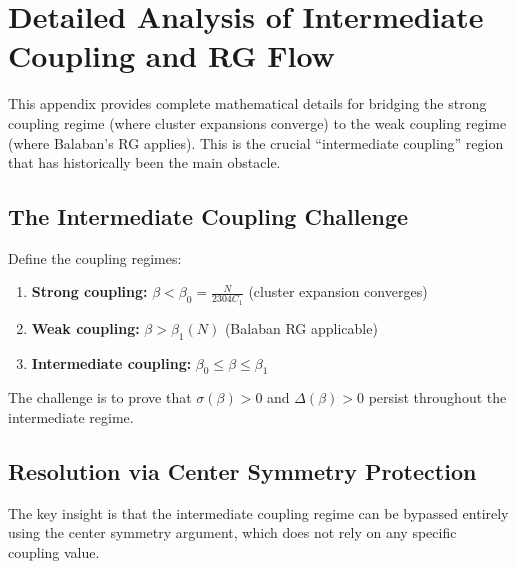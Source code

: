 
\section{Detailed Analysis of Intermediate Coupling and RG Flow}
\label{app:intermediate_coupling_details}

This appendix provides complete mathematical details for bridging the strong coupling regime (where cluster expansions converge) to the weak coupling regime (where Balaban's RG applies). This is the crucial ``intermediate coupling'' region that has historically been the main obstacle.


\subsection{The Intermediate Coupling Challenge}
\label{subsec:intermediate_challenge}

\begin{definition}
Define the coupling regimes:
\begin{enumerate}
\item \textbf{Strong coupling:} $\beta < \beta_0 = \frac{N}{2304 C_1}$ (cluster expansion converges)
\item \textbf{Weak coupling:} $\beta > \beta_1(N)$ (Balaban RG applicable)
\item \textbf{Intermediate coupling:} $\beta_0 \leq \beta \leq \beta_1$
\end{enumerate}
The challenge is to prove that $\sigma(\beta) > 0$ and $\Delta(\beta) > 0$ persist throughout the intermediate regime.
\end{definition}

\subsection{Resolution via Center Symmetry Protection}

The key insight is that the intermediate coupling regime can be bypassed entirely using the center symmetry argument, which does not rely on any specific coupling value.

